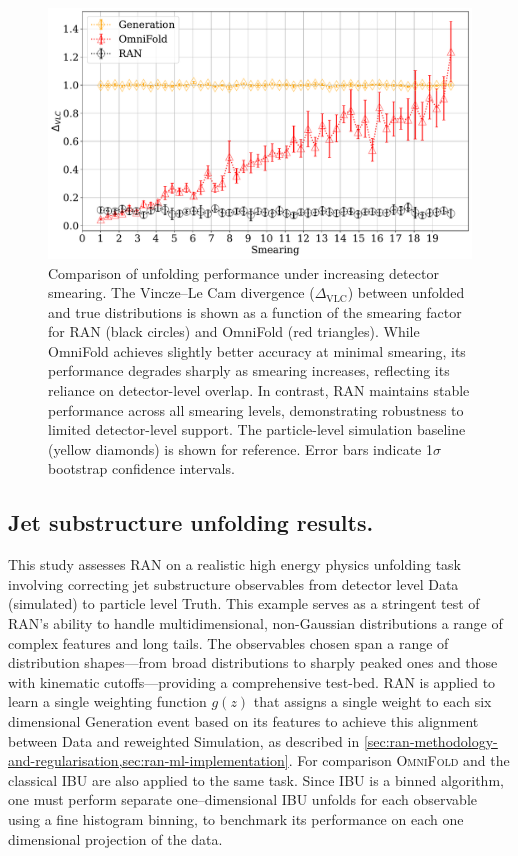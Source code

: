 {{\begin{figure}
    \centering
    \includegraphics[width=\linewidth]{figures/chapter-06/OF_delta.pdf}
    \caption[Unfolding performance comparison between RAN and OmniFold under varying detector smearing]{Comparison of unfolding performance under increasing detector smearing. 
    The Vincze--Le Cam divergence ($\Delta_{\text{VLC}}$) between unfolded and true distributions is shown as a function of the smearing factor for RAN (black circles) and OmniFold (red triangles). 
    While OmniFold achieves slightly better accuracy at minimal smearing, its performance degrades sharply as smearing increases, reflecting its reliance on detector-level overlap. 
    In contrast, RAN maintains stable performance across all smearing levels, demonstrating robustness to limited detector-level support. 
    The particle-level simulation baseline (yellow diamonds) is shown for reference. 
    Error bars indicate 1$\sigma$ bootstrap confidence intervals.}
    \label{fig:omnifold-comp}
\end{figure}
    \subsection{Jet substructure unfolding results.}
        This study assesses RAN on a realistic high energy physics unfolding task involving correcting jet substructure observables from detector level Data (simulated) to particle level Truth.
        This example serves as a stringent test of RAN’s ability to handle multidimensional, non-Gaussian distributions a range of complex features and long tails.
        The observables chosen span a range of distribution shapes---from broad distributions to sharply peaked ones and those with kinematic cutoffs---providing a comprehensive test-bed.
        RAN is applied to learn a single weighting function $g(z)$ that assigns a single weight to each six dimensional Generation event based on its features to achieve this alignment between Data and reweighted Simulation, as described in \cref{sec:ran-methodology-and-regularisation,sec:ran-ml-implementation}.
        For comparison \textsc{OmniFold} and the classical IBU are also applied to the same task.
        Since IBU is a binned algorithm, one must perform separate one--dimensional IBU unfolds for each observable using a fine histogram binning, to benchmark its performance on each one dimensional projection of the data.

}}
